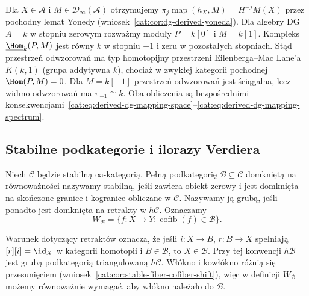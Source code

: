\begin{przyklad}\label{cat:ex:derived-dg-mapping-shifts}
Dla $X\in\mathcal A$ i $M\in\mathcal D_\infty(\mathcal A)$ otrzymujemy $\pi_j\operatorname{map}(h_X,M)=H^{-j}M(X)$ przez pochodny lemat Yonedy (wniosek~\ref{cat:cor:dg-derived-yoneda}). Dla algebry DG $A=k$ w stopniu zerowym rozważmy moduły $P=k[0]$ i $M=k[1]$. Kompleks $\underline{\Hom}_k(P,M)$ jest równy $k$ w stopniu $-1$ i zeru w pozostałych stopniach. Stąd przestrzeń odwzorowań ma typ homotopijny przestrzeni Eilenberga--Mac Lane'a $K(k,1)$ (grupa addytywna $k$), chociaż w zwykłej kategorii pochodnej $\Hom(P,M)=0$. Dla $M=k[-1]$ przestrzeń odwzorowań jest ściągalna, lecz widmo odwzorowań ma $\pi_{-1}\cong k$. Oba obliczenia są bezpośrednimi konsekwencjami~\eqref{cat:eq:derived-dg-mapping-space}--\eqref{cat:eq:derived-dg-mapping-spectrum}.
\end{przyklad}

\subsection{Stabilne podkategorie i ilorazy Verdiera}

\begin{definicja}\label{cat:def:infty-verdier-subcategory}
Niech $\mathcal C$ będzie stabilną $\infty$-kategorią. Pełną podkategorię $\mathcal B\subseteq\mathcal C$ domkniętą na równoważności nazywamy stabilną, jeśli zawiera obiekt zerowy i jest domknięta na skończone granice i kogranice obliczane w $\mathcal C$. Nazywamy ją grubą, jeśli ponadto jest domknięta na retrakty w $h\mathcal C$. Oznaczamy
\[
 W_{\mathcal B}=\{f:X\to Y:\operatorname{cofib}(f)\in\mathcal B\}.
\]
\end{definicja}

Warunek dotyczący retraktów oznacza, że jeśli $i:X\to B$, $r:B\to X$ spełniają $[r][i]=\id_X$ w kategorii homotopii i $B\in\mathcal B$, to $X\in\mathcal B$. Przy tej konwencji $h\mathcal B$ jest grubą podkategorią triangulowaną $h\mathcal C$. Włókno i kowłókno różnią się przesunięciem (wniosek~\ref{cat:cor:stable-fiber-cofiber-shift}), więc w definicji $W_{\mathcal B}$ możemy równoważnie wymagać, aby włókno należało do $\mathcal B$.

